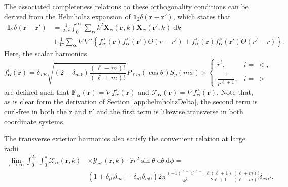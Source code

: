 The associated completeness relations to these orthogonality conditions can be derived from the Helmholtz expansion of $\bm{1}_2\delta(\mathbf{r} - \mathbf{r}')$, which states that 
\begin{equation}\label{eq:vectorSphericalHarmonicCompleteness}
\begin{split}
\bm{1}_2\delta(\mathbf{r} - \mathbf{r}') &= \frac{1}{2\pi^2}\int_0^\infty\sum_{\bm{\alpha}}k^2\mathbf{X}_{\bm{\alpha}}(\mathbf{r},k)\mathbf{X}_{\bm{\alpha}}(\mathbf{r}',k)\;\mathrm{d}k\\
&+ \frac{1}{4\pi}\sum_{\bm{\alpha}}\nabla\nabla'\left\{ f_{\bm{\alpha}}^>(\mathbf{r})f_{\bm{\alpha}}^<(\mathbf{r}')\Theta(r - r') +  f_{\bm{\alpha}}^<(\mathbf{r})f_{\bm{\alpha}}^>(\mathbf{r}')\Theta(r' - r)\right\}.
\end{split}
\end{equation}
Here, the scalar harmonics 
\begin{equation}\label{eq:scalarHarmonics}
f_{\bm{\alpha}}^i(\mathbf{r}) = \delta_{TE}\sqrt{(2 - \delta_{m0})\frac{(\ell - m)!}{(\ell + m)!}}P_{\ell m}(\cos\theta)S_p(m\phi)\times
\begin{cases}
r^\ell, & i = \, <,\\
\dfrac{1}{r^{\ell + 1}}, & i = \,>
\end{cases}
\end{equation}
are defined such that $\mathbf{F}_{\bm{\alpha}}(\mathbf{r}) = \nabla f_{\bm{\alpha}}^<(\mathbf{r})$ and $\bm{\mathcal{F}}_{\bm{\alpha}}(\mathbf{r}) = \nabla f_{\bm{\alpha}}^>(\mathbf{r})$.
Note that, as is clear form the derivation of Section \ref{app:helmholtzDelta}, the second term is curl-free in both the $\mathbf{r}$ and $\mathbf{r}'$ and the first term is likewise transverse in both coordinate systems.

The transverse exterior harmonics also satisfy the convenient relation at large radii
\begin{equation}
\begin{split}
\lim_{r\to\infty}\int_0^{2\pi}\int_0^\pi \bm{\mathcal{X}}_{\bm{\alpha}}(\mathbf{r},k)&\times\bm{\mathcal{Y}}_{\bm{\alpha}'}(\mathbf{r},k)\cdot\hat{\mathbf{r}}r^2\sin\theta\;\mathrm{d}\theta\,\mathrm{d}\phi = \\
&(1 + \delta_{p0}\delta_{m0} - \delta_{p1}\delta_{m0})2\pi\frac{(-1)^{\ell + 1}\mathrm{i}^{2\ell + 1}}{k^2}\frac{\ell(\ell + 1)}{2\ell + 1}\frac{(\ell + m)!}{(\ell - m)!}\delta_{\bm{\alpha}\bm{\alpha}'}.
\end{split}
\end{equation}

